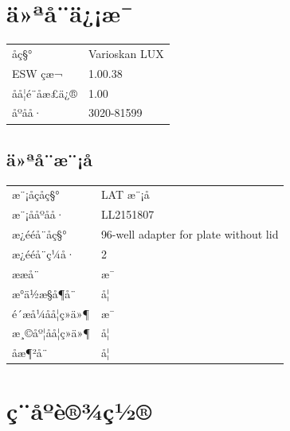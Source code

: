 \documentclass[UTF8,10pt,a4paper,fontset=fandol]{ctexart}
\newcommand{\fieldvalue}[1]{#1}
\begin{document}
\section*{ä»ªå¨ä¿¡æ¯}

\begin{tabularx}{\textwidth}{@{}l X@{}}
åç§° &
\fieldvalue{Varioskan LUX}
\\
ESW çæ¬ &
\fieldvalue{1.00.38}
\\
åå­¦é¨åæ£ä¿® &
\fieldvalue{1.00}
\\
åºåå· &
\fieldvalue{3020-81599}
\end{tabularx}

\subsection*{ä»ªå¨æ¨¡å}

\begin{tabularx}{\textwidth}{@{}l X@{}}
æ¨¡åçåç§° &
\fieldvalue{LAT æ¨¡å}
\\
æ¨¡ååºåå· &
\fieldvalue{LL2151807}
\\
æ¿ééå¨åç§° &
\fieldvalue{96-well adapter for plate without lid}
\\
æ¿ééå¨ç¼å· &
\fieldvalue{2}
\\
ææå¨ &
\fieldvalue{æ¯}
\\
æ°ä½æ§å¶å¨ &
\fieldvalue{å¦}
\\
é´æ­å¼åå­¦ç»ä»¶ &
\fieldvalue{æ¯}
\\
æ¸©åº¦åå­¦ç»ä»¶ &
\fieldvalue{å¦}
\\
åæ¶²å¨ &
\fieldvalue{å¦}
\end{tabularx}

\section*{ç¨åºè®¾ç½®}
\end{document}
